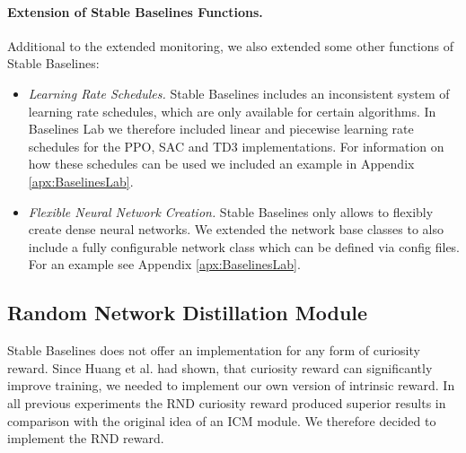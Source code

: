 \paragraph{Extension of Stable Baselines Functions.}
Additional to the extended monitoring, we also extended some other functions of Stable Baselines:

\begin{itemize}
    \item \textit{Learning Rate Schedules.} Stable Baselines includes an inconsistent system of learning rate schedules, which are only available for certain algorithms. In Baselines Lab we therefore included linear and piecewise learning rate schedules for the PPO, SAC and TD3 implementations. For information on how these schedules can be used we included an example in Appendix \ref{apx:BaselinesLab}.
    \item \textit{Flexible Neural Network Creation.} Stable Baselines only allows to flexibly create dense neural networks. We extended the network base classes to also include a fully configurable network class which can be defined via config files. For an example see Appendix \ref{apx:BaselinesLab}.
\end{itemize}


\subsection{Random Network Distillation Module} \label{sec:blRND}
Stable Baselines does not offer an implementation for any form of curiosity reward. Since Huang et al. had shown, that curiosity reward can significantly improve training, we needed to implement our own version of intrinsic reward. In all previous experiments the RND curiosity reward produced superior results in comparison with the original idea of an ICM module. We therefore decided to implement the RND reward. 

